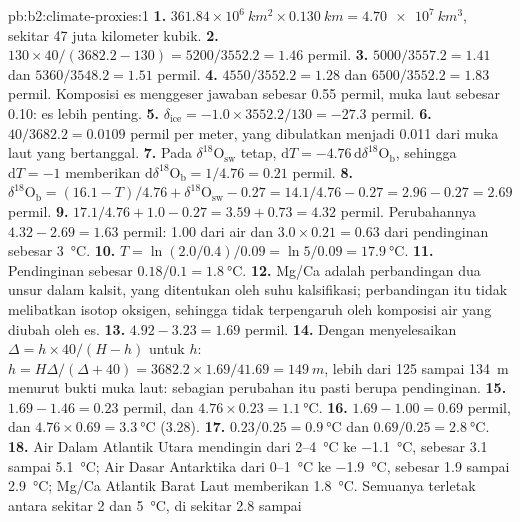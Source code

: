 \begin{solution}{pb:b2:climate-proxies:1}
\textbf{1.} $361.84 \times 10^6\ \unit{km^2} \times \qty{0.130}{km} = \qty{4.70e7}{km^3}$, sekitar 47
juta kilometer kubik.
\textbf{2.} $130 \times 40/(3682.2 - 130) = 5200/3552.2 = 1.46$ permil.
\textbf{3.} $5000/3557.2 = 1.41$ dan $5360/3548.2 = 1.51$ permil.
\textbf{4.} $4550/3552.2 = 1.28$ dan $6500/3552.2 = 1.83$ permil. Komposisi es
menggeser jawaban sebesar \num{0.55} permil, muka laut sebesar \num{0.10}: es lebih penting.
\textbf{5.} $\delta_{\mathrm{ice}} = -1.0 \times 3552.2/130 = -27.3$ permil.
\textbf{6.} $40/3682.2 = 0.0109$ permil per meter, yang dibulatkan menjadi \num{0.011} dari muka laut
yang bertanggal.
\textbf{7.} Pada $\delta^{18}\mathrm{O}_{\mathrm{sw}}$ tetap, $\mathrm{d}T = -4.76\,\mathrm{d}\delta^{18}
\mathrm{O}_{\mathrm{b}}$, sehingga $\mathrm{d}T = -1$ memberikan $\mathrm{d}\delta^{18}\mathrm{O}_{\mathrm{b}} =
1/4.76 = 0.21$ permil.
\textbf{8.} $\delta^{18}\mathrm{O}_{\mathrm{b}} = (16.1 - T)/4.76 + \delta^{18}\mathrm{O}_{\mathrm{sw}}
- 0.27 = 14.1/4.76 - 0.27 = 2.96 - 0.27 = 2.69$ permil.
\textbf{9.} $17.1/4.76 + 1.0 - 0.27 = 3.59 + 0.73 = 4.32$ permil. Perubahannya $4.32 - 2.69 =
1.63$ permil: \num{1.00} dari air dan $3.0 \times 0.21 = 0.63$ dari pendinginan sebesar
\qty{3}{\celsius}.
\textbf{10.} $T = \ln(2.0/0.4)/0.09 = \ln 5/0.09 = \qty{17.9}{\celsius}$.
\textbf{11.} Pendinginan sebesar $0.18/0.1 = \qty{1.8}{\celsius}$.
\textbf{12.} Mg/Ca adalah perbandingan dua unsur dalam kalsit, yang ditentukan oleh suhu
kalsifikasi; perbandingan itu tidak melibatkan isotop oksigen, sehingga tidak terpengaruh oleh komposisi
air yang diubah oleh es.
\textbf{13.} $4.92 - 3.23 = 1.69$ permil.
\textbf{14.} Dengan menyelesaikan $\Delta = h \times 40/(H - h)$ untuk $h$: $h = H\Delta/(\Delta + 40) = 3682.2
\times 1.69/41.69 = \qty{149}{m}$, lebih dari 125 sampai \qty{134}{m} menurut bukti muka laut:
sebagian perubahan itu pasti berupa pendinginan.
\textbf{15.} $1.69 - 1.46 = 0.23$ permil, dan $4.76 \times 0.23 = \qty{1.1}{\celsius}$.
\textbf{16.} $1.69 - 1.00 = 0.69$ permil, dan $4.76 \times 0.69 = \qty{3.3}{\celsius}$ (3.28).
\textbf{17.} $0.23/0.25 = \qty{0.9}{\celsius}$ dan $0.69/0.25 = \qty{2.8}{\celsius}$.
\textbf{18.} Air Dalam Atlantik Utara mendingin dari 2--\qty{4}{\celsius} ke \qty{-1.1}{\celsius},
sebesar 3.1 sampai \qty{5.1}{\celsius}; Air Dasar Antarktika dari 0--\qty{1}{\celsius} ke
\qty{-1.9}{\celsius}, sebesar 1.9 sampai \qty{2.9}{\celsius}; Mg/Ca Atlantik Barat Laut memberikan
\qty{1.8}{\celsius}. Semuanya terletak antara sekitar 2 dan \qty{5}{\celsius}, di sekitar 2.8 sampai

\end{solution}
